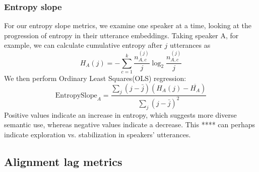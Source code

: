 \documentclass{article}
\theoremstyle{definition}
\numberwithin{table}{section}
\begin{document}
\subsubsection{Entropy slope} 

For our entropy slope metrics, we examine one speaker at a time, looking at the progression of entropy in their utterance embeddings. Taking speaker A, for example, we can calculate cumulative entropy after $j$ utterances as \begin{equation}
    H_A(j)=-\sum_{c=1}^{k}\frac{n_{A,c}^{(j)}}{j}\log_2\frac{n_{A,c}^{(j)}}{j}
\end{equation}
We then perform Ordinary Least Squares(OLS) regression: 
\begin{equation}
    \text{EntropySlope}_A=\frac{\sum_j (j-\bar{j})(H_A(j)-\overline{H_A})}{\sum_j (j-\bar{j})^2}
\end{equation}
Positive values indicate an increase in entropy, which suggests more diverse semantic use, whereas negative values indicate a decrease. This **** can perhaps indicate exploration vs. stabilization in speakers' utterances. 

\subsection{Alignment lag metrics}
\end{document}

